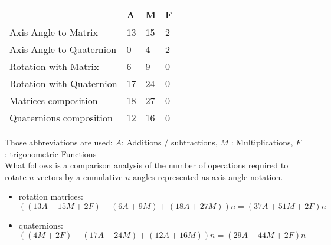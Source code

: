 \begin{table}[H]
\begin{tabular}{llll}
 & A & M & F \\ \hline
\rowcolor[HTML]{FD6864} 
Axis-Angle to Matrix & 13 & 15 & 2 \\
\rowcolor[HTML]{9AFF99} 
Axis-Angle to Quaternion & 0 & 4 & 2 \\ \hline \hline
\rowcolor[HTML]{9AFF99} 
Rotation with Matrix & 6 & 9 & 0 \\
\rowcolor[HTML]{FD6864} 
Rotation with Quaternion & 17 & 24 & 0 \\ \hline \hline
\rowcolor[HTML]{FD6864} 
Matrices composition & 18 & 27 & 0 \\
\rowcolor[HTML]{9AFF99} 
Quaternions composition & 12 & 16 & 0 \\ \hline
\end{tabular}
\end{table}
Those abbreviations are used: $A$: Additions / subtractions, $M$ : Multiplications, $F$: trigonometric Functions \\
What follows is a comparison analysis of the number of operations required to rotate $n$ vectors by a cumulative $n$ angles represented as axis-angle notation. \\
\begin{itemize}
\item rotation matrices: ${((13A + 15M + 2F) + (6A + 9M) + (18A + 27M))n} = {(37A + 51M + 2F)n}$
\item quaternions: ${((4M + 2F) + (17A + 24M) + (12A + 16M))n} = {(29A + 44M + 2F)n}$
\end{itemize}

